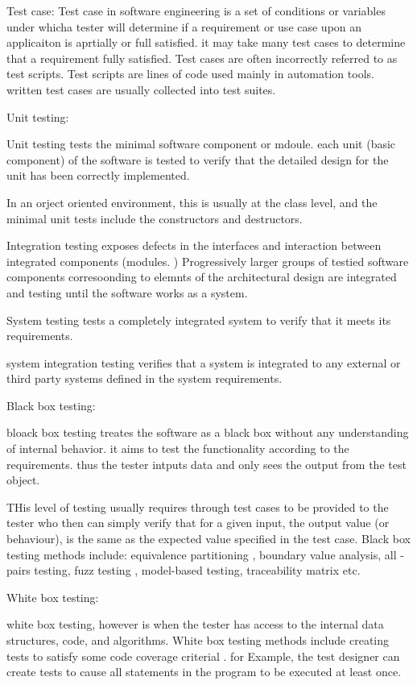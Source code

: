 Test case:
Test case in software engineering is a set of conditions or variables under whicha tester will determine if a requirement or use case upon an applicaiton is aprtially or full satisfied. 
it may take many test cases to determine that a requirement fully satisfied. Test cases are often incorrectly referred
to as test scripts. Test scripts are lines of code used mainly in automation tools. written test cases are usually collected into test suites. 


Unit testing:

Unit testing tests the minimal software component or mdoule. each unit (basic component) of the software is tested to verify that the detailed design for the unit has been correctly implemented. 

In an orject oriented environment, this is usually at the class level, and the minimal unit tests include the constructors and destructors. 

Integration testing exposes defects in the interfaces and interaction between integrated components (modules. ) Progressively larger groups of testied software components corresoonding to elemnts of the architectural design are integrated and 
testing until the software works as a system. 

System testing tests a completely integrated system to verify that it meets its requirements. 

system integration testing verifies that a system is integrated to any external or third party systems defined in the system 
requirements. 

Black box testing:

bloack box testing treates the software as a black box without any understanding of internal behavior. it aims to test the functionality according
to the requirements. thus the tester intputs data and only sees the output from the test object. 

THis level of testing usually requires through test cases to be provided to the tester who then can simply verify that for a given input, the output value (or behaviour),
is the same as the expected value specified in the test case. Black box testing methods include: equivalence partitioning , boundary value analysis, all - pairs testing, 
fuzz testing , model-based testing, traceability matrix etc. 


White box testing: 

white box testing, however is when the tester has access to the internal data structures, code, and algorithms. White box testing methods include
creating tests to satisfy some code coverage criterial . for Example, the test designer can create tests to cause all statements in the program to be executed at least once. 


